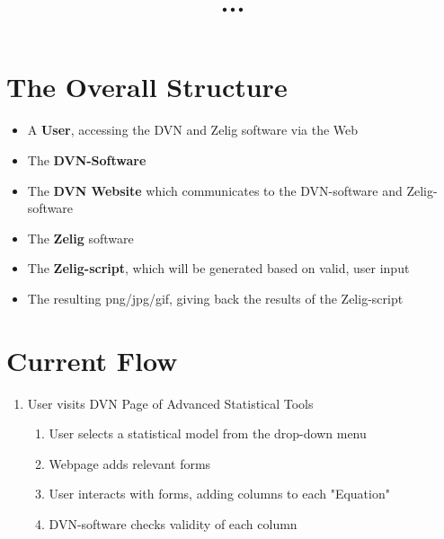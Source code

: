 \documentclass{article}
\title{...}
\begin{document}
\maketitle

\section{The Overall Structure}
\begin{itemize}
  \item A {\bf User}, accessing the DVN and Zelig software via the Web
  \item The {\bf DVN-Software}
  \item The {\bf DVN Website} which communicates to the DVN-software and Zelig-software
  \item The {\bf Zelig} software
  \item The {\bf Zelig-script}, which will be generated based on valid, user input
  \item The resulting png/jpg/gif, giving back the results of the Zelig-script
\end{itemize}

\section{Current Flow}

\begin{enumerate}
  \item User visits DVN Page of Advanced Statistical Tools
    \begin{enumerate}
      \item User selects a statistical model from the drop-down menu
      \item Webpage adds relevant forms
      \item User interacts with forms, adding columns to each "Equation"
      \item DVN-software checks validity of each column
    \end{enumerate}
\end{enumerate}
\end{document}
